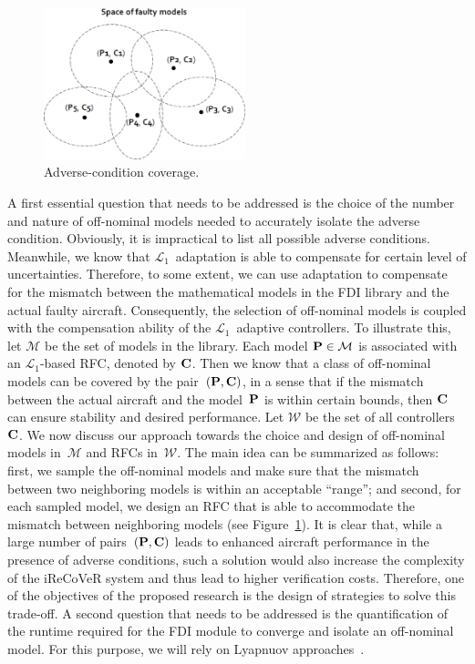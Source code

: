 \documentclass[letter,onecolumn,12pt]{aiaa-tc}
\newcommand{\Lone}{\mathcal{L}_1}
\begin{document}
\begin{figure}
\centering
\includegraphics[width=2.3in]{FDImodes.eps}
\caption{\footnotesize Adverse-condition coverage.}
\label{fig:FDImodes}
\end{figure}


A first essential question that needs to be addressed is the choice of the number and nature of off-nominal models needed to accurately isolate the adverse condition. Obviously, it is impractical to list all possible adverse conditions. Meanwhile, we know that $\Lone$~adaptation is able to compensate for certain level of uncertainties. Therefore, to some extent, we can use adaptation to compensate for the mismatch between the mathematical models in the FDI library and the actual faulty aircraft. Consequently, the selection of off-nominal models is coupled with the compensation ability of the $\Lone$~adaptive controllers. To illustrate this, let $\mathcal{M}$ be the set of models in the library. Each model ${\bf P}\in\mathcal{M}$ is associated with an $\Lone$-based RFC, denoted by ${\bf C}$. Then we know that a class of off-nominal models can be covered by the pair~$({\bf P, C})$, in a sense that if the mismatch between the actual aircraft and the model~${\bf P}$ is within certain bounds, then ${\bf C}$ can ensure stability and desired performance. Let $\mathcal{W}$ be the set of all controllers~${\bf C}$. We now discuss our approach towards the choice and design of off-nominal models in~$\mathcal{M}$ and RFCs in~$\mathcal{W}$. The main idea can be summarized as follows: first, we sample the off-nominal models and make sure that the mismatch between two neighboring models is within an acceptable ``range''; and second, for each sampled model, we design an RFC that is able to accommodate the mismatch between neighboring models (see Figure~\ref{fig:FDImodes}). It is clear that, while a large number of pairs~$({\bf P,C})$ leads to enhanced aircraft performance in the presence of adverse conditions, such a solution would also increase the complexity of the iReCoVeR system and thus lead to higher verification costs. Therefore, one of the objectives of the proposed research is the design of strategies to solve this trade-off. A second question that needs to be addressed is the quantification of the runtime required for the FDI module to converge and isolate an off-nominal model. For this purpose, we will rely on Lyapnuov approaches~\cite{Seto96,cervin02,bamieh03,marti04,nesic-04,palopoli-05,imer2006measure,tabuada2007tac,cervin2008scheduling,mmazo2008cdc,pwan2009cdc, heemels2010tac}.
\end{document}
